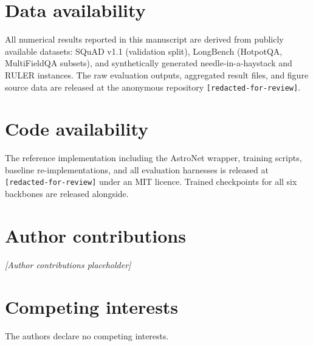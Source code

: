 \documentclass[sn-nature,Numbered]{sn-jnl}
\begin{document}

\section*{Data availability}
All numerical results reported in this manuscript are derived from
publicly available datasets: SQuAD v1.1 (validation split), LongBench
(HotpotQA, MultiFieldQA subsets), and synthetically generated
needle-in-a-haystack and RULER instances. The raw evaluation outputs,
aggregated result files, and figure source data are released at the
anonymous repository \texttt{[redacted-for-review]}.

\section*{Code availability}
The reference implementation including the AstroNet wrapper, training
scripts, baseline re-implementations, and all evaluation harnesses is
released at \texttt{[redacted-for-review]} under an MIT licence. Trained
checkpoints for all six backbones are released alongside.

\section*{Author contributions}
\textit{[Author contributions placeholder]}

\section*{Competing interests}
The authors declare no competing interests.


\end{document}
